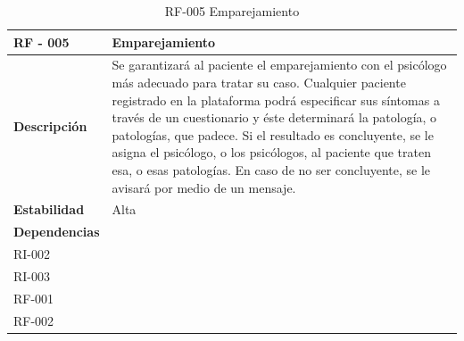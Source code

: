 \begin{table}[htpb]
\centering
\begin{tabularx}{\textwidth}{|l|X|}
\hline
\rowcolor[gray]{0.9}\textbf{RF - 005}                               & \textbf{Emparejamiento                                                                                                                                                                                                                                                                    } \\ \hline
\textbf{Descripción}                             & Se garantizará al paciente el emparejamiento con el psicólogo más adecuado para tratar su caso. Cualquier paciente registrado en la plataforma podrá especificar sus síntomas a través de un cuestionario y éste determinará la patología, o patologías, que padece. Si el resultado es concluyente, se le asigna el psicólogo, o los psicólogos, al paciente que traten esa, o esas patologías. En caso de no ser concluyente, se le avisará por medio de un mensaje. \\ \hline
\textbf{Estabilidad}                             & Alta                                                                                                                                                                                                                                                                               \\ \hline
\textbf{Dependencias} & \begin{tabular}[c]{@{}l@{}}RI-001\\ RI-002\\ RI-003\\ RF-001\\ RF-002\end{tabular}                                                                                                                                                                                                 \\ \hline
\end{tabularx}
\caption{RF-005 Emparejamiento}
\end{table}

